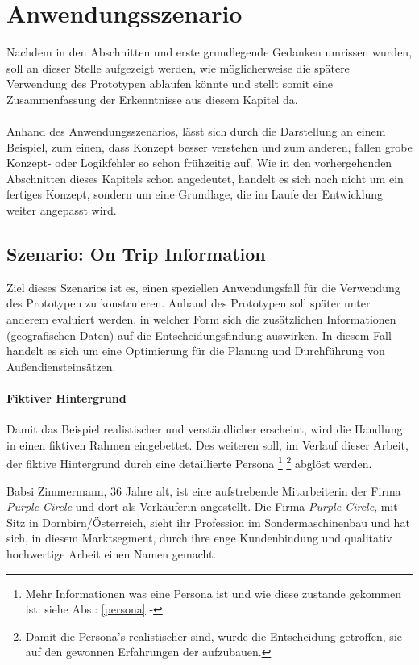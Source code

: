 \documentclass[Bachelorarbeit.tex]{subfiles}
\begin{document}
\section{Anwendungsszenario}
\label{sec:anwendungsszenario}
Nachdem in den Abschnitten  und  erste grundlegende Gedanken umrissen wurden, soll an dieser Stelle aufgezeigt werden, wie möglicherweise die spätere Verwendung des Prototypen ablaufen könnte und stellt somit eine Zusammenfassung der Erkenntnisse aus diesem Kapitel da.\\
\\
Anhand des Anwendungsszenarios, lässt sich durch die Darstellung an einem Beispiel, zum einen, dass Konzept besser verstehen und zum anderen, fallen grobe Konzept- oder Logikfehler so schon frühzeitig auf.
Wie in den vorhergehenden Abschnitten dieses Kapitels schon angedeutet, handelt es sich noch nicht um ein fertiges Konzept, sondern um eine Grundlage, die im Laufe der Entwicklung weiter angepasst wird.

\subsection{Szenario: On Trip Information }
Ziel dieses Szenarios ist es, einen speziellen Anwendungsfall für die Verwendung des Prototypen zu konstruieren. 
Anhand des Prototypen soll später unter anderem evaluiert werden, in welcher Form sich die zusätzlichen Informationen (geografischen Daten) auf die Entscheidungsfindung auswirken.
In diesem Fall handelt es sich um eine Optimierung für die Planung und Durchführung von Außendiensteinsätzen. 

\paragraph*{Fiktiver Hintergrund}
Damit das Beispiel realistischer und verständlicher erscheint, wird die Handlung in einen fiktiven Rahmen eingebettet. 
Des weiteren soll, im Verlauf dieser Arbeit, der fiktive Hintergrund durch eine detaillierte Persona
\footnote{
	Mehr Informationen was eine Persona ist und wie diese zustande gekommen ist: siehe Abs.: \ref{persona} - 
	} 
\footnote{
	Damit die Persona's realistischer sind, wurde die Entscheidung getroffen,
	sie auf den gewonnen Erfahrungen der  aufzubauen.
	} 
abglöst werden.
\newpage

Babsi Zimmermann, 36 Jahre alt, ist eine aufstrebende Mitarbeiterin der Firma \textit{Purple Circle} und dort als Verkäuferin angestellt. 
Die Firma \textit{Purple Circle}, mit Sitz in Dornbirn/Österreich, sieht ihr Profession im Sondermaschinenbau und hat sich, in diesem Marktsegment, durch ihre enge Kundenbindung und qualitativ hochwertige Arbeit einen Namen gemacht. 
\end{document}
